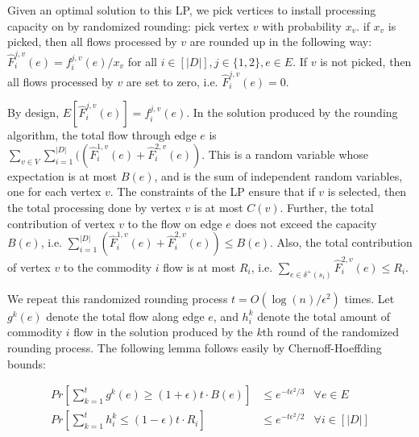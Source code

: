 
Given an optimal solution to this LP, we pick vertices to install processing capacity on by randomized rounding:
pick vertex $v$ with probability $x_v$. if $x_v$ is picked, then all flows processed by $v$ are rounded up in the
following way: $\hat{F}_i^{j,v}(e) = f_{i}^{j,v}(e)/x_v$ for all $i \in [|D|], j \in \{1,2\}, e \in E$. If $v$ is not picked, then all flows processed by $v$ are set to zero, i.e. $\hat{F}_i^{j,v}(e) = 0$.

By design, $E[\hat{F}_i^{j,v}(e) ] = f_{i}^{j,v}(e)$.
In the solution produced by the rounding algorithm, the total flow through edge $e$ is  
$\displaystyle \sum_{v \in V} \sum_{i=1}^{|D|} ((\hat{F}_i^{1,v}(e) + \hat{F}_i^{2,v}(e))$.
This is a random variable whose expectation is at most $B(e)$, 
and is the sum of independent random variables, one for each vertex $v$.
The constraints of the LP ensure that if $v$ is selected, then the total processing done by vertex $v$ is at most $C(v)$. 
Further, the total contribution of vertex $v$ to the flow on edge $e$ 
does not exceed the capacity $B(e)$, i.e.
$\displaystyle \sum_{i=1}^{|D|} (\hat{F}_i^{1,v}(e) + \hat{F}_i^{2,v}(e)) \leq B(e)$.
Also, the total contribution of vertex $v$ to the commodity $i$ flow is at most $R_i$, i.e.
$\displaystyle \sum_{e \in \delta^+(s_i)} \hat{F}_i^{2,v}(e) \leq R_i$.

We repeat this randomized rounding process $t=O(\log(n)/\epsilon^2)$ times.
Let $g^k(e)$ denote the total flow along edge $e$, and $h^k_i$ denote the total amount of commodity $i$ flow 
in the solution produced by the $k$th round of the randomized rounding process.
The following lemma follows easily by Chernoff-Hoeffding bounds:

\begin{lemma}
\begin{align}
Pr\left[\sum_{k=1}^t g^k(e) \geq (1+\epsilon)t \cdot B(e)\right] &\leq e^{-t \epsilon^2/3} &\forall e \in E\\
Pr\left[\sum_{k=1}^t h^k_i \leq (1-\epsilon) t \cdot R_i \right]  &\leq e^{-t \epsilon^2/2} &\forall i \in [|D|]
\end{align}
\end{lemma}


